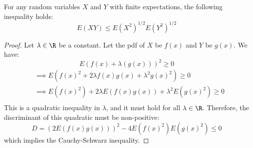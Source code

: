\documentclass[openany]{book}
\begin{document}
\begin{mytheorem}
For any random variables $X$ and $Y$ with finite expectations, the following inequality holds:
$$E(XY) \leq E(X^2)^{1/2} E(Y^2)^{1/2}$$
\end{mytheorem}
\begin{proof}
    Let $\lambda \in \R$ be a constant. Let the pdf of $X$ be $f(x)$ and $Y$ be $g(x)$. We have: 
    $$E(f(x) + \lambda(g(x)))^2 \geq 0$$
    \begin{align*}
        &\implies E(f(x)^2 + 2\lambda f(x)g(x) + \lambda^2 g(x)^2) \geq 0 \\
        &\implies E(f(x)^2) + 2\lambda E(f(x)g(x)) + \lambda^2 E(g(x)^2) \geq 0 \\
    \end{align*}
    This is a quadratic inequality in $\lambda$, and it must hold for all $\lambda \in \R$. Therefore, the discriminant of this quadratic must be non-positive:
    $$D = (2E(f(x)g(x)))^2 - 4E(f(x)^2)E(g(x)^2) \leq 0$$
    which implies the Cauchy-Schwarz inequality.
\end{proof}
\end{document}
